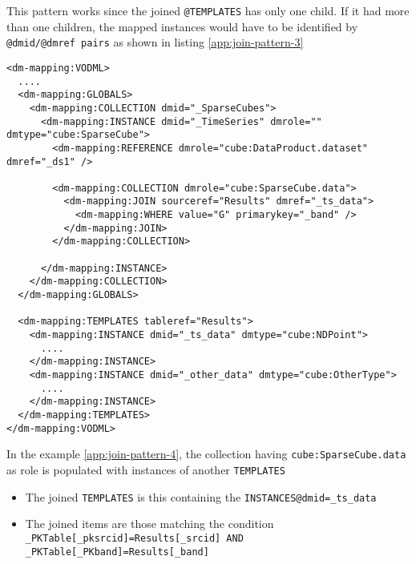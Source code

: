 This pattern works since the joined \texttt{@TEMPLATES} has only one child. 
If it had more than one children, the mapped instances would have to be identified by  \texttt{@dmid/@dmref pairs} as shown in listing \ref{app:join-pattern-3}

\begin{lstlisting}[frame=single,label={app:join-pattern-3},caption={Joining a TEMPLATES with a global COLLECTION identified by both @sourceref and @dmid/@dmref pairs},style=XML,basicstyle=\tiny]
<dm-mapping:VODML>
  ....
  <dm-mapping:GLOBALS>
    <dm-mapping:COLLECTION dmid="_SparseCubes">
      <dm-mapping:INSTANCE dmid="_TimeSeries" dmrole="" dmtype="cube:SparseCube">
        <dm-mapping:REFERENCE dmrole="cube:DataProduct.dataset" dmref="_ds1" />
        
        <dm-mapping:COLLECTION dmrole="cube:SparseCube.data">
          <dm-mapping:JOIN sourceref="Results" dmref="_ts_data">
            <dm-mapping:WHERE value="G" primarykey="_band" />
          </dm-mapping:JOIN>
        </dm-mapping:COLLECTION>
        
      </dm-mapping:INSTANCE>
    </dm-mapping:COLLECTION>
  </dm-mapping:GLOBALS>

  <dm-mapping:TEMPLATES tableref="Results">
    <dm-mapping:INSTANCE dmid="_ts_data" dmtype="cube:NDPoint">
      ....
    </dm-mapping:INSTANCE>
    <dm-mapping:INSTANCE dmid="_other_data" dmtype="cube:OtherType">
      ....
    </dm-mapping:INSTANCE>
  </dm-mapping:TEMPLATES>
</dm-mapping:VODML>
\end{lstlisting}  

In the example \ref{app:join-pattern-4}, the collection having \texttt{cube:SparseCube.data} as role is populated with  instances of another \texttt{TEMPLATES}
\begin{itemize}
  \item The joined \texttt{TEMPLATES} is this containing the  \texttt{INSTANCES@dmid=\_ts\_data}
  \item The joined items are those matching the condition  \texttt{\_PKTable[\_pksrcid]=Results[\_srcid] AND  \_PKTable[\_PKband]=Results[\_band]}
\end{itemize}


